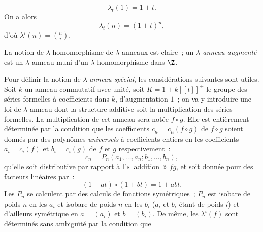\begin{equation}\tag{1.4}
\lambda_t(1)=1+t.
\end{equation}
On a alors
\begin{equation}\tag{1.5}
\lambda_t(n)=(1+t)^n,
\end{equation}
d'où $\lambda^i(n)=\binom{n}{i}$.

La
notion de $\lambda$-homomorphisme de $\lambda$-anneaux est claire~; un \emph{$\lambda$-anneau augmenté} est un $\lambda$-anneau muni d'un $\lambda$-homomorphisme dans $\Z$.

Pour définir la notion de $\lambda$-\emph{anneau spécial}, les considérations suivantes sont utiles. Soit $k$ un anneau commutatif avec unité, soit $K=1+k[[t]]^+$ le groupe des séries formelles à coefficients dans $k$, d'augmentation $1$~; on va y introduire une loi de $\lambda$-anneau dont la structure additive soit la multiplication des séries formelles. La multiplication de cet anneau sera notée $f\circ g$. Elle est entièrement déterminée par la condition que les coefficients $c_n=c_n(f\circ g)$ de $f\circ g$ soient donnés par des polynômes \emph{universels} à coefficients entiers en les coefficients $a_i=c_i(f)$ et $b_i=c_i(g)$ de $f$ et $g$ respectivement~:
\begin{equation}\tag{1.6}
c_n=P_n(a_1,\ldots,a_n;b_1,\ldots,b_n),
\end{equation}
qu'elle soit distributive par rapport à l'«~addition~» $fg$, et soit donnée pour des facteurs linéaires par~:
\begin{equation}\tag{1.7}
(1+at)\circ(1+bt)=1+abt.
\end{equation}
Les $P_n$ se calculent par des calculs de fonctions symétriques~; $P_n$ est isobare de poids $n$ en les $a_i$ et isobare de poids $n$ en les $b_i$ ($a_i$ et $b_i$ étant de poids $i$) et d'ailleurs symétrique en $a=(a_i)$ et $b=(b_i)$. De même, les $\lambda^i(f)$ sont déterminés sans ambiguïté par la condition que 
